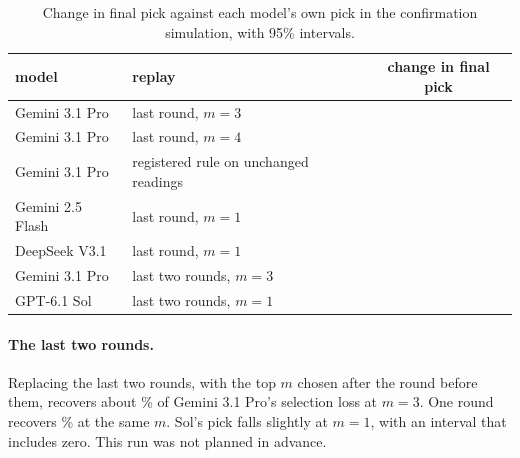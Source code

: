 \begin{table}[!htbp]
\centering
\small
\caption{Change in final pick against each model's own pick in the confirmation simulation, with 95\% intervals.}
\label{tab:aone}
\begin{tabular}{llc}
\toprule
model & replay & change in final pick \\
\midrule
Gemini 3.1 Pro & last round, $m = 3$ & \estci{\nAoneProKthree}{\nAoneProKthreeci} \\
Gemini 3.1 Pro & last round, $m = 4$ & \estci{\nAoneProKfour}{\nAoneProKfourci} \\
Gemini 3.1 Pro & registered rule on unchanged readings & \estci{\nAoneProRepick}{\nAoneProRepickci} \\
Gemini 2.5 Flash & last round, $m = 1$ & \estci{\nAoneFlashKone}{\nAoneFlashKoneci} \\
DeepSeek V3.1 & last round, $m = 1$ & \estci{\nAoneDeepKone}{\nAoneDeepKoneci} \\
Gemini 3.1 Pro & last two rounds, $m = 3$ & \estci{\nAtwoProKthree}{\nAtwoProKthreeci} \\
GPT-6.1 Sol & last two rounds, $m = 1$ & \estci{\nAtwoSolKone}{\nAtwoSolKoneci} \\
\bottomrule
\end{tabular}
\end{table}

\paragraph{The last two rounds.} Replacing the last two rounds, with the top $m$ chosen after the round before them,
recovers about \nAtwoProRecoveredOwn\% of Gemini 3.1 Pro's selection loss at $m = 3$. One round recovers \nAoneProRecoveredKthree\% at the same $m$. Sol's pick falls slightly at $m = 1$, with an interval that includes zero. This run was not planned in advance.


